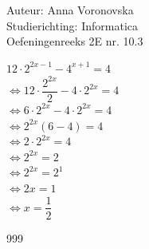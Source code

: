 \documentclass[a4paper]{article}
\begin{document}
  
\noindent \large Auteur: Anna Voronovska \\
\noindent \large Studierichting: Informatica\\
\noindent \large Oefeningenreeks 2E nr. 10.3\\

\medskip

\normalsize

$12 \cdot 2^{2x-1} - 4^{x+1} = 4$ \\

$\Leftrightarrow 12 \cdot \dfrac{2^{2x}}{2} - 4 \cdot 2^{2x} = 4$ \\

$\Leftrightarrow 6 \cdot 2^{2x} - 4 \cdot 2^{2x} = 4$ \\

$\Leftrightarrow 2^{2x} (6 - 4) = 4$ \\

$\Leftrightarrow 2 \cdot 2^{2x} = 4$ \\

$\Leftrightarrow 2^{2x} = 2$ \\

$\Leftrightarrow 2^{2x} = 2^1$ \\

$\Leftrightarrow 2x = 1$ \\

$\Leftrightarrow x = \dfrac{1}{2}$


\begin{thebibliography}{999}
\end{thebibliography}
\end{document}

